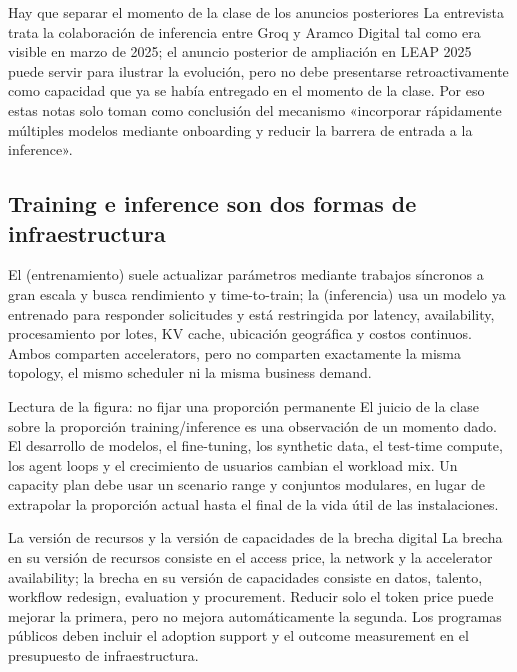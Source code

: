 \begin{warningbox}{Hay que separar el momento de la clase de los anuncios posteriores}
La entrevista trata la colaboración de inferencia entre Groq y Aramco Digital tal como era visible en marzo de 2025; el anuncio posterior de ampliación en LEAP 2025 puede servir para ilustrar la evolución, pero no debe presentarse retroactivamente como capacidad que ya se había entregado en el momento de la clase. Por eso estas notas solo toman como conclusión del mecanismo «incorporar rápidamente múltiples modelos mediante onboarding y reducir la barrera de entrada a la inference».
\end{warningbox}

\subsection{Training e inference son dos formas de infraestructura}

El  (entrenamiento) suele actualizar parámetros mediante trabajos síncronos a gran escala y busca rendimiento y time-to-train; la  (inferencia) usa un modelo ya entrenado para responder solicitudes y está restringida por latency, availability, procesamiento por lotes, KV cache, ubicación geográfica y costos continuos. Ambos comparten accelerators, pero no comparten exactamente la misma topology, el mismo scheduler ni la misma business demand.


\begin{knowledgebox}{Lectura de la figura: no fijar una proporción permanente}
El juicio de la clase sobre la proporción training/inference es una observación de un momento dado. El desarrollo de modelos, el fine-tuning, los synthetic data, el test-time compute, los agent loops y el crecimiento de usuarios cambian el workload mix. Un capacity plan debe usar un scenario range y conjuntos modulares, en lugar de extrapolar la proporción actual hasta el final de la vida útil de las instalaciones.
\end{knowledgebox}

\begin{importantbox}{La versión de recursos y la versión de capacidades de la brecha digital}
La brecha en su versión de recursos consiste en el access price, la network y la accelerator availability; la brecha en su versión de capacidades consiste en datos, talento, workflow redesign, evaluation y procurement. Reducir solo el token price puede mejorar la primera, pero no mejora automáticamente la segunda. Los programas públicos deben incluir el adoption support y el outcome measurement en el presupuesto de infraestructura.
\end{importantbox}

